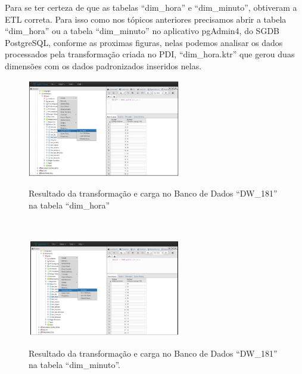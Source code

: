 Para se ter certeza de que as tabelas ``dim\_hora'' e ``dim\_minuto'', obtiveram a ETL correta. Para isso como nos t\'{o}picos anteriores 
precisamos abrir a tabela ``dim\_hora'' ou a tabela ``dim\_minuto'' no aplicativo pgAdmin4, do SGDB PostgreSQL, conforme 
as proximas figuras, nelas podemos analisar os dados processados pela transforma\c{c}\~{a}o criada no PDI, ``dim\_hora.ktr'' 
que gerou duas dimens\~{o}es com os dados padronizados inseridos nelas.

\begin{figure}[H]
	\vspace*{0,2cm}
    \centering
    \caption{Resultado da transforma\c{c}\~{a}o e carga no Banco de Dados ``DW\_181'' na tabela ``dim\_hora''}
    \includegraphics[width=0.6\textwidth]{./04-figuras/figura-res-dim-hora}
    \label{fig:ilustfigresdimhora}
\end{figure}
\vspace*{-0,9cm}
{\raggedright {}} \\

\begin{figure}[H]
	\vspace*{0,2cm}
    \centering
    \caption{ Resultado da transforma\c{c}\~{a}o e carga no Banco de Dados ``DW\_181'' na tabela ``dim\_minuto''.}
    \includegraphics[width=0.6\textwidth]{./04-figuras/figura-res-dim-minuto}
    \label{fig:ilustfigresdimminuto}
\end{figure}
\vspace*{-0,9cm}
{\raggedright {}} \\

